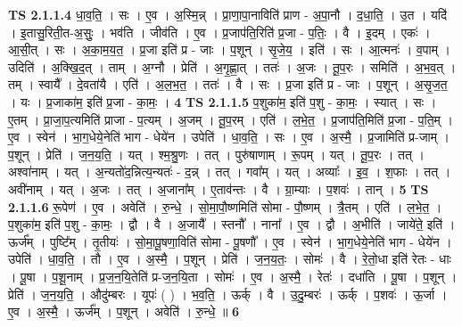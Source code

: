 \documentclass[17pt]{extarticle}
\begin{document}
                  \newline
                                \textbf{ TS 2.1.1.4} \newline
                  धा॒व॒ति॒ । सः । ए॒व । अ॒स्मि॒न्न् । प्रा॒णा॒पा॒नाविति॑ प्राण - अ॒पा॒नौ । द॒धा॒ति॒ । उ॒त । यदि॑ । इ॒तासु॒रिती॒त-अ॒सुः॒ । भव॑ति । जीव॑ति । ए॒व । प्र॒जाप॑ति॒रिति॑ प्र॒जा - प॒तिः॒ । वै । इ॒दम् । एकः॑ । आ॒सी॒त् । सः । अ॒का॒म॒य॒त॒ । प्र॒जा इति॑ प्र - जाः । प॒शून् । सृ॒जे॒य॒ । इति॑ । सः । आ॒त्मनः॑ । व॒पाम् । उदिति॑ । अ॒क्खि॒द॒त् । ताम् । अ॒ग्नौ । प्रेति॑ । अ॒गृ॒ह्णा॒त् । ततः॑ । अ॒जः । तू॒प॒रः । समिति॑ । अ॒भ॒व॒त् । तम् । स्वायै᳚ । दे॒वता॑यै । एति॑ । अ॒ल॒भ॒त॒ । ततः॑ । वै । सः । प्र॒जा इति॑ प्र - जाः । प॒शून् । अ॒सृ॒ज॒त॒ । यः । प्र॒जाका॑म॒ इति॑ प्र॒जा - का॒मः॒ । \textbf{  4} \newline
                  \newline
                                \textbf{ TS 2.1.1.5} \newline
                  प॒शुका॑म॒ इति॑ प॒शु - का॒मः॒ । स्यात् । सः । ए॒तम् । प्रा॒जा॒प॒त्यमिति॑ प्राजा - प॒त्यम् । अ॒जम् । तू॒प॒रम् । एति॑ । ल॒भे॒त॒ । प्र॒जाप॑ति॒मिति॑ प्र॒जा - प॒ति॒म् । ए॒व । स्वेन॑ । भा॒ग॒धेये॒नेति॑ भाग - धेये॑न । उपेति॑ । धा॒व॒ति॒ । सः । ए॒व । अ॒स्मै॒ । प्र॒जामिति॑ प्र-जाम् । प॒शून् । प्रेति॑ । ज॒न॒य॒ति॒ । यत् । श्म॒श्रु॒णः । तत् । पुरु॑षाणाम् । रू॒पम् । यत् । तू॒प॒रः । तत् । अश्वा॑नाम् । यत् । अ॒न्यतो॑द॒न्नित्य॒न्यतः॑ - द॒न्न् । तत् । गवा᳚म् । यत् । अव्याः᳚ । इ॒व॒ । श॒फाः । तत् । अवी॑नाम् । यत् । अ॒जः । तत् । अ॒जाना᳚म् । ए॒ताव॑न्तः । वै । ग्रा॒म्याः । प॒शवः॑ । तान् । \textbf{  5} \newline
                  \newline
                                \textbf{ TS 2.1.1.6} \newline
                  रू॒पेण॑ । ए॒व । अवेति॑ । रु॒न्धे॒ । सो॒मा॒पौ॒ष्णमिति॑ सोमा - पौ॒ष्णम् । त्रै॒तम् । एति॑ । ल॒भे॒त॒ । प॒शुका॑म॒ इति॑ प॒शु - का॒मः॒ । द्वौ । वै । अ॒जायै᳚ । स्तनौ᳚ । नाना᳚ । ए॒व । द्वौ । अ॒भीति॑ । जाये॑ते॒ इति॑ । ऊर्ज᳚म् । पुष्टि᳚म् । तृ॒तीयः॑ । सो॒मा॒पू॒षणा॒विति॑ सोमा - पू॒षणौ᳚ । ए॒व । स्वेन॑ । भा॒ग॒धेये॒नेति॑ भाग - धेये॑न । उपेति॑ । धा॒व॒ति॒ । तौ । ए॒व । अ॒स्मै॒ । प॒शून् । प्रेति॑ । ज॒न॒य॒तः॒ । सोमः॑ । वै । रे॒तो॒धा इति॑ रेतः - धाः । पू॒षा । प॒शू॒नाम् । प्र॒ज॒न॒यि॒तेति॑ प्र-ज॒न॒यि॒ता । सोमः॑ । ए॒व । अ॒स्मै॒ । रेतः॑ । दधा॑ति । पू॒षा । प॒शून् । प्रेति॑ । ज॒न॒य॒ति॒ । औदु॑म्बरः । यूपः॑ ( ) । भ॒व॒ति॒ । ऊर्क् । वै । उ॒दु॒म्बरः॑ । ऊर्क् । प॒शवः॑ । ऊ॒र्जा । ए॒व । अ॒स्मै॒ । ऊर्ज᳚म् । प॒शून् । अवेति॑ । रु॒न्धे॒ ॥ \textbf{  6 } \newline
                  \newline
\end{document}
